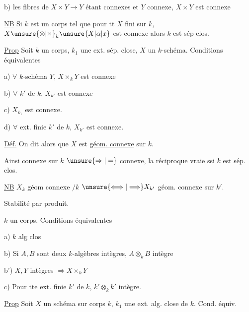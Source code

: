b) les fibres de $X\times Y\to Y$ étant connexes  et $Y$ connexe, $X\times Y$ est connexe

\uline{NB} Si $k$ est un corps tel que pour tt $X$  fini sur $k$, $X\unsure{\otimes|\times}_k \unsure{X|\alpha|x}$ est connexe alors $k$ est sép clos.

\uline{Prop} Soit $k$ un corps, $k_1$ une ext.  sép. close, $X$ un $k$-schéma. Conditions équivalentes

a) $\forall$ $k$-schéma $Y$, $X\times_k Y$ est connexe

b) $\forall$  $k'$ de $k$, $X_{k'}$ est connexe

c)  $X_{k_1}$ est connexe.

d) $\forall$ ext. finie  $k'$ de $k$, $X_{k'}$ est connexe.


\uline{Déf.} On dit alors que $X$ est \uline{géom. connexe} sur $k$.

Ainsi   connexe sur $k$ $\unsure{\Rightarrow|=}$ connexe, la réciproque vraie ssi $k$ est sép. clos.

\uline{NB} $X_k$ géom connexe $/k$ $\unsure{\Longleftrightarrow|\Longrightarrow} X_{k'}$ géom. connexe sur $k'$.

Stabilité par produit.


$k$ un corps. Conditions équivalentes


a) $k$ alg clos

b) Si $A,B$ sont deux $k$-algèbres intègres, $A\otimes_k B$ intègre

b')  $X,Y$ intègres $\Rightarrow X\times_k Y$ 

c) Pour tte ext. finie $k'$ de $k$, $k'\otimes_k k'$ intègre.

\uline{Prop} Soit $X$ un schéma sur corps $k$, $k_1$ une ext. alg. close de $k$. Cond. équiv.

